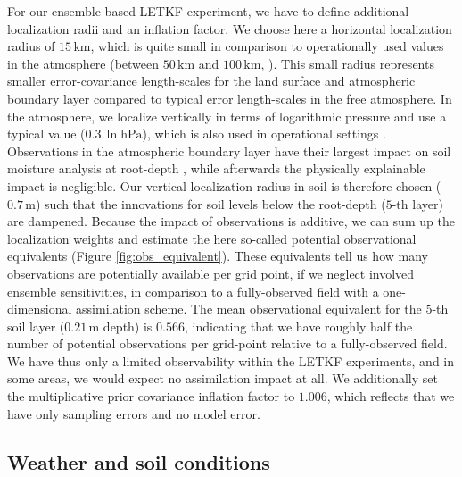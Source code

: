 \documentclass[HESSD, manuscript]{copernicus}
\begin{document}
For our ensemble-based LETKF experiment, we have to define additional localization radii and an inflation factor.
We choose here a horizontal localization radius of $15\,\text{km}$, which is quite small in comparison to operationally used values in the atmosphere (between $50\,\text{km}$ and $100\,\text{km}$, \citealt{schraff_kilometre-scale_2016}).
This small radius represents smaller error-covariance length-scales for the land surface and atmospheric boundary layer compared to typical error length-scales in the free atmosphere.
In the atmosphere, we localize vertically in terms of logarithmic pressure and use a typical value ($0.3\,\ln\text{hPa}$), which is also used in operational settings \citep{schraff_kilometre-scale_2016}.
Observations in the atmospheric boundary layer have their largest impact on soil moisture analysis at root-depth \citep{munozsabater_assimilation_2019}, while afterwards the physically explainable impact is negligible.
Our vertical localization radius in soil is therefore chosen ($0.7\,\text{m}$) such that the innovations for soil levels below the root-depth ($5$-th layer) are dampened.
Because the impact of observations is additive, we can sum up the localization weights and estimate the here so-called potential observational equivalents (Figure \ref{fig:obs_equivalent}).
These equivalents tell us how many observations are potentially available per grid point, if we neglect involved ensemble sensitivities, in comparison to a fully-observed field with a one-dimensional assimilation scheme.
The mean observational equivalent for the $5$-th soil layer ($0.21\,\text{m}$ depth) is $0.566$, indicating that we have roughly half the number of potential observations per grid-point relative to a fully-observed field.
We have thus only a limited observability within the LETKF experiments, and in some areas, we would expect no assimilation impact at all.
We additionally set the multiplicative prior covariance inflation factor to $1.006$, which reflects that we have only sampling errors and no model error.

\subsection{Weather and soil conditions}
\end{document}
